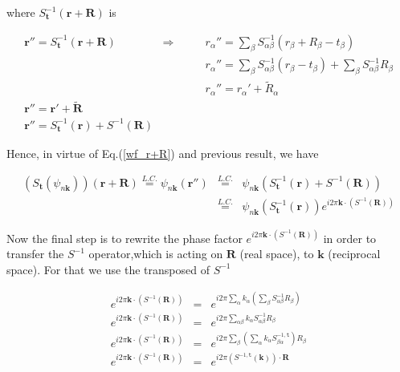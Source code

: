 \documentclass[a4paper,12pt]{report}
\begin{document}
where $S_{\mathbf{t}}^{-1}\left( \mathbf{r}+\mathbf{R}\right)$ is

\begin{eqnarray}
\mathbf{r}'' = S_{\mathbf{t}}^{-1}\left( \mathbf{r}+\mathbf{R}\right) \qquad &\Rightarrow&  \qquad r_{\alpha}'' = \sum_{\beta} S_{\alpha \beta}^{-1}\left( r_{\beta} + R_{\beta} - t_{\beta}\right) \nonumber \\
&& \qquad r_{\alpha}'' = \sum_{\beta} S_{\alpha \beta}^{-1}\left( r_{\beta} - t_{\beta}\right) + \sum_{\beta} S_{\alpha \beta}^{-1}R_{\beta} \nonumber \\
&& \qquad r_{\alpha}'' = r_{\alpha}' + \tilde{R}_{\alpha} \nonumber\\
\mathbf{r}'' = \mathbf{r}' + \tilde{\mathbf{R}} \qquad \qquad \quad&& \nonumber\\
\mathbf{r}'' =  S_{\mathbf{t}}^{-1}\left( \mathbf{r}\right) +  S^{-1}\left(\mathbf{R}\right)  &&
\end{eqnarray}

Hence, in virtue of Eq.(\ref{wf_r+R}) and previous result, we have

\begin{eqnarray}
\left( S_{\mathbf{t}} \left( \psi_{n\mathbf{k}}\right) \right) (\mathbf{r}+\mathbf{R}) \stackrel{L.C.}{=} \psi_{n\mathbf{k}}(\mathbf{r}'') &\stackrel{L.C.}{=}& \psi_{n\mathbf{k}}(S_{\mathbf{t}}^{-1}\left( \mathbf{r}\right) + S^{-1}\left(\mathbf{R}\right)) \nonumber \\
&\stackrel{L.C.}{=}& \psi_{n\mathbf{k}}(S_{\mathbf{t}}^{-1}\left( \mathbf{r}\right)) e^{i2\pi\mathbf{k}\cdotp\left(S^{-1}\left(\mathbf{R}\right)\right) }
\end{eqnarray}

Now the final step is to rewrite the phase factor $e^{i2\pi\mathbf{k}\cdotp\left(S^{-1}\left(\mathbf{R}\right)\right)}$ in order to transfer the $S^{-1}$ operator,which is acting on $\mathbf{R}$ (real space), to $\mathbf{k}$ (reciprocal space). For that we use the transposed of $S^{-1}$

\begin{eqnarray}
e^{i2\pi\mathbf{k}\cdotp\left(S^{-1}\left(\mathbf{R}\right)\right) } &=& e^{i2\pi \sum_{\alpha}k_{\alpha} \left(\sum_{\beta}S^{-1}_{\alpha\beta} R_{\beta}\right) } \nonumber \\
e^{i2\pi\mathbf{k}\cdotp\left(S^{-1}\left(\mathbf{R}\right)\right) } &=& e^{i2\pi \sum_{\alpha\beta}k_{\alpha} S^{-1}_{\alpha\beta} R_{\beta} } \nonumber \\
e^{i2\pi\mathbf{k}\cdotp\left(S^{-1}\left(\mathbf{R}\right)\right) } &=& e^{i2\pi \sum_{\beta} \left(\sum_{\alpha} k_{\alpha} S^{-1,\mathtt{t}}_{\beta\alpha}\right) R_{\beta} } \nonumber \\
e^{i2\pi\mathbf{k}\cdotp\left(S^{-1}\left(\mathbf{R}\right)\right) } &=& e^{i2\pi\left(S^{-1,\mathtt{t}}\left(\mathbf{k}\right)\right)\cdotp\mathbf{R} }
\end{eqnarray}
\end{document}
